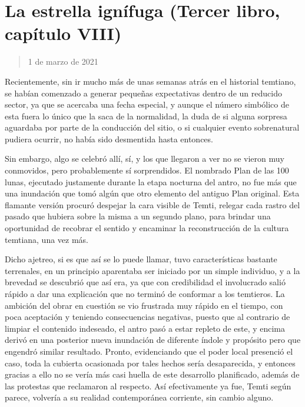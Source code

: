 \documentclass[
]{book}
\begin{document}
\hypertarget{la-estrella-ignuxedfuga-tercer-libro-capuxedtulo-viii}{%
\section{La estrella ignífuga (Tercer libro, capítulo VIII)}\label{la-estrella-ignuxedfuga-tercer-libro-capuxedtulo-viii}}

\begin{quote}
1 de marzo de 2021
\end{quote}

Recientemente, sin ir mucho más de unas semanas atrás en el historial temtiano, se habían comenzado a generar pequeñas expectativas dentro de un reducido sector, ya que se acercaba una fecha especial, y aunque el número simbólico de esta fuera lo único que la saca de la normalidad, la duda de si alguna sorpresa aguardaba por parte de la conducción del sitio, o si cualquier evento sobrenatural pudiera ocurrir, no había sido desmentida hasta entonces.

Sin embargo, algo se celebró allí, sí, y los que llegaron a ver no se vieron muy conmovidos, pero probablemente sí sorprendidos. El nombrado Plan de las 100 lunas, ejecutado justamente durante la etapa nocturna del antro, no fue más que una inundación que tomó algún que otro elemento del antiguo Plan original. Esta flamante versión procuró despejar la cara visible de Temti, relegar cada rastro del pasado que hubiera sobre la misma a un segundo plano, para brindar una oportunidad de recobrar el sentido y encaminar la reconstrucción de la cultura temtiana, una vez más.

Dicho ajetreo, si es que así se lo puede llamar, tuvo características bastante terrenales, en un principio aparentaba ser iniciado por un simple individuo, y a la brevedad se descubrió que así era, ya que con credibilidad el involucrado salió rápido a dar una explicación que no terminó de conformar a los temtieros. La ambición del obrar en cuestión se vio frustrada muy rápido en el tiempo, con poca aceptación y teniendo consecuencias negativas, puesto que al contrario de limpiar el contenido indeseado, el antro pasó a estar repleto de este, y encima derivó en una posterior nueva inundación de diferente índole y propósito pero que engendró similar resultado. Pronto, evidenciando que el poder local presenció el caso, toda la cubierta ocasionada por tales hechos sería desaparecida, y entonces gracias a ello no se vería más casi huella de este desarrollo planificado, además de las protestas que reclamaron al respecto. Así efectivamente ya fue, Temti según parece, volvería a su realidad contemporánea corriente, sin cambio alguno.
\end{document}
